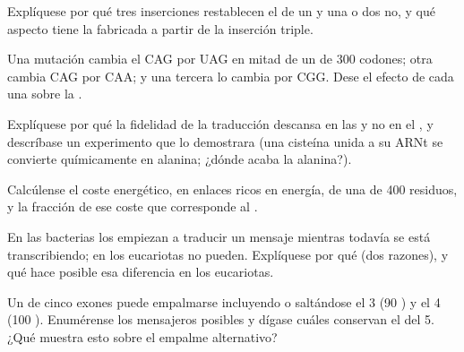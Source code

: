 \begin{exercise}[$\star\star$]\label{exo:b1:gene-expression:6}
Explíquese por qué tres inserciones restablecen el  de un
 y una o dos no, y qué aspecto tiene la  fabricada a partir de la
inserción triple.
\end{exercise}

\begin{exercise}[$\star\star$]\label{exo:b1:gene-expression:7}
Una mutación cambia el  CAG por UAG en mitad de un  de \qty{300}{}
codones; otra cambia CAG por CAA; y una tercera lo cambia por CGG. Dese el
efecto de cada una sobre la .
\end{exercise}

\begin{exercise}[$\star\star$]\label{exo:b1:gene-expression:8}
Explíquese por qué la fidelidad de la traducción descansa en las
 y no en el , y descríbase un experimento
que lo demostrara (una cisteína unida a su ARNt se convierte químicamente en
alanina; ¿dónde acaba la alanina?).
\end{exercise}

\begin{exercise}[$\star\star$]\label{exo:b1:gene-expression:9}
Calcúlense el coste energético, en enlaces ricos en energía, de una 
de \qty{400}{} residuos, y la fracción de ese coste que corresponde al
.
\end{exercise}

\begin{exercise}[$\star\star\star$]\label{exo:b1:gene-expression:10}
En las bacterias los  empiezan a traducir un mensaje mientras
todavía se está transcribiendo; en los eucariotas no pueden. Explíquese por
qué (dos razones), y qué hace posible esa diferencia en los eucariotas.
\end{exercise}

\begin{exercise}[$\star\star\star$]\label{exo:b1:gene-expression:11}
Un  de cinco exones puede empalmarse incluyendo o saltándose el  3
(\qty{90}{} ) y el  4 (\qty{100}{} ). Enumérense
los mensajeros posibles y dígase cuáles conservan el  del
 5. ¿Qué muestra esto sobre el empalme alternativo?
\end{exercise}

